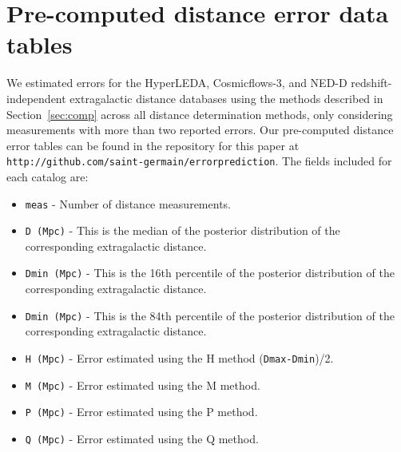 \documentclass[a4paper,fleqn,usenatbib]{mnras}
\begin{document}
\section{Pre-computed distance error data tables}
We estimated errors for the HyperLEDA, Cosmicflows-3, and NED-D redshift-independent extragalactic distance databases using the methods described in Section~\ref{sec:comp} across all distance determination methods, only considering measurements with more than two reported errors. Our pre-computed distance error tables can be found in the repository for this paper at \texttt{http://github.com/saint-germain/errorprediction}. The fields included for each catalog are:
\begin{itemize}
\item \texttt{meas} - Number of distance measurements.
\item \texttt{D (Mpc)} - This is the median of the posterior distribution of the corresponding extragalactic distance.
\item \texttt{Dmin (Mpc)} - This is the 16th percentile of the posterior distribution of the corresponding extragalactic distance.
\item \texttt{Dmin (Mpc)} - This is the 84th percentile of the posterior distribution of the corresponding extragalactic distance.
\item \texttt{H (Mpc)} - Error estimated using the H method (\texttt{Dmax-Dmin})/2.
\item \texttt{M (Mpc)} - Error estimated using the M method. 
\item \texttt{P (Mpc)} - Error estimated using the P method. 
\item \texttt{Q (Mpc)} - Error estimated using the Q method. 
\end{itemize}
\end{document}
